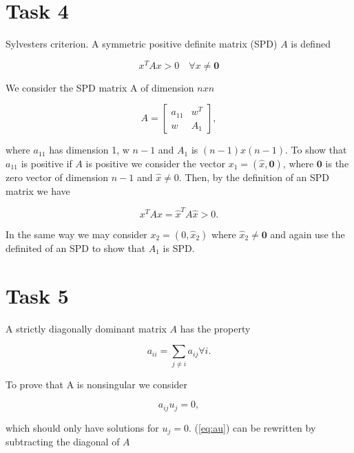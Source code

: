 \documentclass[11pt]{article}
\begin{document}
    \section{Task 4}\label{task-4}

Sylvesters criterion. A symmetric positive definite matrix (SPD) \(A\)
is defined

\begin{equation}
x^T A x > 0 \quad \forall x \neq \boldsymbol{0} 
\end{equation}

We consider the SPD matrix A of dimension \(nxn\)

\begin{equation}
A = \begin{bmatrix}
    a_11 & w^T \\
    w    & A_1
    \end{bmatrix},
\end{equation}

where \(a_11\) has dimension 1, w \(n-1\) and \(A_1\) is
\((n-1)x(n-1)\). To show that \(a_{11}\) is positive if \(A\) is
positive we consider the vector \(x_1=(\hat{x},\boldsymbol{0})\), where
\(\boldsymbol{0}\) is the zero vector of dimension \(n-1\) and
\(\hat{x} \neq 0\). Then, by the definition of an SPD matrix we have

\begin{equation}
x^T A x = \hat{x}^T A \hat{x} > 0.
\end{equation}

In the same way we may consider \(x_2=(0,\hat{x}_2)\) where
\(\hat{x}_2 \neq \boldsymbol{0}\) and again use the definited of an SPD
to show that \(A_1\) is SPD.

    \section{Task 5}\label{task-5}

A strictly diagonally dominant matrix \(A\) has the property

\begin{equation}
 a_{ii} = \sum_{j \neq i} a_{ij} \forall i.
 \label{eq:strict_def}
\end{equation}

To prove that A is nonsingular we consider

\begin{equation}
 a_{ij}u_j = 0,
 \label{eq:au}
\end{equation}

which should only have solutions for \(u_j=0\). (\ref{eq:au}) can be
rewritten by subtracting the diagonal of \(A\)
\end{document}
